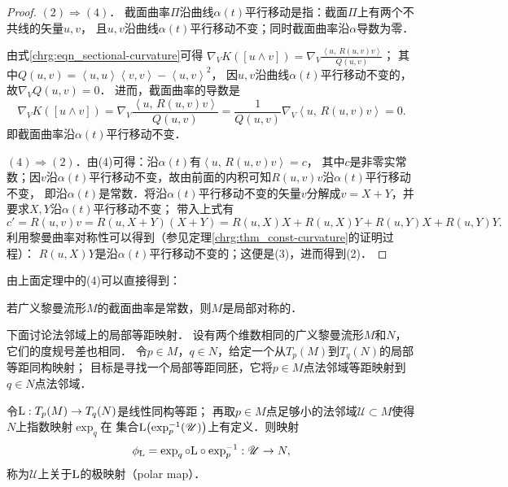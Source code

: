 \begin{proof}
    $(2) \Rightarrow (4)$．
    截面曲率$\Pi$沿曲线$\alpha(t)$平行移动是指：截面$\Pi$上有两个不共线的矢量$u,v$，
    且$u,v$沿曲线$\alpha(t)$平行移动不变；同时截面曲率沿$\alpha$导数为零．
    
    由式\eqref{chrg:eqn_sectional-curvature}可得
    $ \nabla_V K([u\wedge v]) =  \nabla_V \frac{\left<u,\ R (u, v) v \right>}{Q(u,v)} $；
    其中$Q(u,v)= \left<u,u\right> \left<v,v\right> -   \left<u,v\right>^2 $，
    因$u,v$沿曲线$\alpha(t)$平行移动不变的，故$\nabla_V Q(u,v)=0$．
    进而，截面曲率的导数是
    \begin{equation}
    \nabla_V K([u\wedge v]) =  \nabla_V \frac{\left<u,\,R (u, v) v \right>}{Q(u,v)}
    = \frac{1}{Q(u,v)} \nabla_V \left<u,\, R (u, v) v \right> = 0 .
    \end{equation}
    即截面曲率沿$\alpha(t)$平行移动不变．
    
    $(4)\Rightarrow (2)$．由(4)可得：沿$\alpha(t)$有$\left<u,\, R (u, v) v \right>= c $，
    其中$c$是非零实常数；因$v$沿$\alpha(t)$平行移动不变，故由前面的内积可知$R (u, v) v$沿$\alpha(t)$平行移动不变，
    即沿$\alpha(t)$是常数．将沿$\alpha(t)$平行移动不变的矢量$v$分解成$v=X+Y$，并要求$X,Y$沿$\alpha(t)$平行移动不变；
    带入上式有
    \begin{equation*}
        c'= R (u, v) v = R (u,X+Y) (X+Y)=R (u,X) X + R (u,X) Y+R (u,Y) X+R (u,Y) Y .
    \end{equation*}
    利用黎曼曲率对称性可以得到（参见定理\ref{chrg:thm_const-curvature}的证明过程）：
    $R (u,X) Y$是沿$\alpha(t)$平行移动不变的；这便是(3)，进而得到(2)．
\end{proof}

由上面定理中的(4)可以直接得到：
\begin{corollary}
    若广义黎曼流形$M$的截面曲率是常数，则$M$是局部对称的．
\end{corollary}


下面讨论法邻域上的局部等距映射．
设有两个维数相同的广义黎曼流形$M$和$N$，它们的度规号差也相同．
令$p\in M$，$q\in N$，给定一个从$T_p(M)$到$T_q(N)$的局部等距同构映射；
目标是寻找一个局部等距同胚，它将$p\in M$点法邻域等距映射到$q\in N$点法邻域．


\begin{definition}\label{chhss:def_polarmap}
    令${\rm L }:T_p(M)\to T_q(N)$是线性同构等距；
    再取$p\in M$点足够小的法邻域$\mathscr{U}\subset M$使得$N$上指数映射$\exp_q$在
    集合${\rm  L}\bigl(\exp_p^{-1}(\mathscr{U})\bigr)$上有定义．则映射
    \begin{equation}\label{chhss:eqn_polarmap}
        \phi_{\rm L} = \exp_q \circ {\rm L}\circ \exp^{-1}_p : \mathscr{U}\to N ,
    \end{equation}
    称为$\mathscr{U}$上关于$\rm L$的{\heiti 极映射}（polar map）．
\end{definition}

